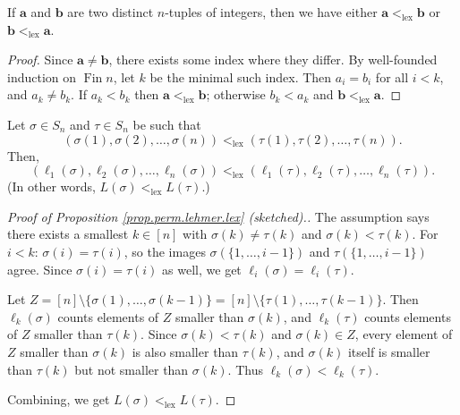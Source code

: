 \begin{proposition}
\label{prop.perm.lehmer.lex-ord.total}
\leantarget
\leanok
If $\mathbf{a}$ and $\mathbf{b}$ are two
distinct $n$-tuples of integers, then we have either $\mathbf{a}
<_{\operatorname{lex}}\mathbf{b}$ or $\mathbf{b}<_{\operatorname{lex}}
\mathbf{a}$.
\end{proposition}

\begin{proof}
\leanok
Since $\mathbf{a} \neq \mathbf{b}$, there exists some index where they differ.
By well-founded induction on $\operatorname{Fin} n$, let $k$ be the minimal such index.
Then $a_i = b_i$ for all $i < k$, and $a_k \neq b_k$.
If $a_k < b_k$ then $\mathbf{a} <_{\operatorname{lex}} \mathbf{b}$;
otherwise $b_k < a_k$ and $\mathbf{b} <_{\operatorname{lex}} \mathbf{a}$.
\end{proof}

\begin{proposition}
\label{prop.perm.lehmer.lex}
\leantarget
\leanok
Let $\sigma\in S_{n}$ and $\tau\in S_{n}$ be such that
\[
\left(\sigma\left(1\right),\sigma\left(2\right),\ldots,\sigma\left(
n\right)\right) <_{\operatorname{lex}}\left(\tau\left(1\right)
,\tau\left(2\right),\ldots,\tau\left(n\right)\right).
\]
Then,
\[
\left(\ell_{1}\left(\sigma\right),\ell_{2}\left(\sigma\right)
,\ldots,\ell_{n}\left(\sigma\right)\right) <_{\operatorname{lex}}\left(
\ell_{1}\left(\tau\right),\ell_{2}\left(\tau\right),\ldots,\ell
_{n}\left(\tau\right)\right).
\]
(In other words, $L\left(\sigma\right) <_{\operatorname{lex}} L\left(
\tau\right)$.)
\end{proposition}

\begin{proof}[Proof of Proposition \ref{prop.perm.lehmer.lex} (sketched).]
\leanok
The assumption says there exists a smallest $k \in [n]$ with
$\sigma(k) \neq \tau(k)$ and $\sigma(k) < \tau(k)$.
For $i < k$: $\sigma(i) = \tau(i)$, so the images
$\sigma(\{1,\ldots,i-1\})$ and $\tau(\{1,\ldots,i-1\})$ agree.
Since $\sigma(i) = \tau(i)$ as well, we get $\ell_i(\sigma) = \ell_i(\tau)$.

Let $Z = [n] \setminus \{\sigma(1),\ldots,\sigma(k-1)\}
= [n] \setminus \{\tau(1),\ldots,\tau(k-1)\}$.
Then $\ell_k(\sigma)$ counts elements of $Z$ smaller than $\sigma(k)$,
and $\ell_k(\tau)$ counts elements of $Z$ smaller than $\tau(k)$.
Since $\sigma(k) < \tau(k)$ and $\sigma(k) \in Z$,
every element of $Z$ smaller than $\sigma(k)$ is also smaller than $\tau(k)$,
and $\sigma(k)$ itself is smaller than $\tau(k)$ but not smaller than $\sigma(k)$.
Thus $\ell_k(\sigma) < \ell_k(\tau)$.

Combining, we get $L(\sigma) <_{\operatorname{lex}} L(\tau)$.
\end{proof}

